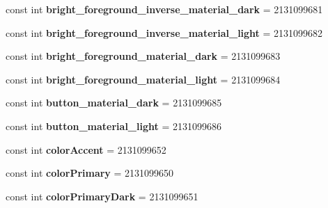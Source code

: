 \begin{DoxyCompactItemize}
const int {\bfseries bright\+\_\+foreground\+\_\+inverse\+\_\+material\+\_\+dark} = 2131099681
\item 
\mbox{\label{classst_delivery_1_1_resource_1_1_color_a721648a2474b04bfab82af82a1c24022}} 
const int {\bfseries bright\+\_\+foreground\+\_\+inverse\+\_\+material\+\_\+light} = 2131099682
\item 
\mbox{\label{classst_delivery_1_1_resource_1_1_color_aaaf12df42ec998ffceb9965c5b3d71d1}} 
const int {\bfseries bright\+\_\+foreground\+\_\+material\+\_\+dark} = 2131099683
\item 
\mbox{\label{classst_delivery_1_1_resource_1_1_color_a8207880fbc74f05cff9b464bbe1552b7}} 
const int {\bfseries bright\+\_\+foreground\+\_\+material\+\_\+light} = 2131099684
\item 
\mbox{\label{classst_delivery_1_1_resource_1_1_color_a3c2921bad7a1afea82ffddcd15108036}} 
const int {\bfseries button\+\_\+material\+\_\+dark} = 2131099685
\item 
\mbox{\label{classst_delivery_1_1_resource_1_1_color_a02019cc4bd258ca955ab415b55694669}} 
const int {\bfseries button\+\_\+material\+\_\+light} = 2131099686
\item 
\mbox{\label{classst_delivery_1_1_resource_1_1_color_a5ea23e769cc9bac1be949b16db16e172}} 
const int {\bfseries color\+Accent} = 2131099652
\item 
\mbox{\label{classst_delivery_1_1_resource_1_1_color_a6df33691caf64d762df2a14227055ee3}} 
const int {\bfseries color\+Primary} = 2131099650
\item 
\mbox{\label{classst_delivery_1_1_resource_1_1_color_ae9d9d96c539238e1ed96e5cfa7b6aa3f}} 
const int {\bfseries color\+Primary\+Dark} = 2131099651
\item 
\mbox{\label{classst_delivery_1_1_resource_1_1_color_a80f1338b82daa600d70821d2d49d8089}} 

\end{DoxyCompactItemize}
